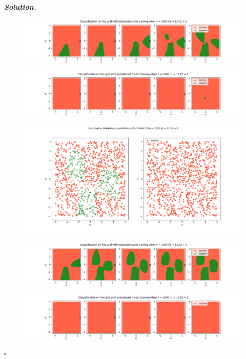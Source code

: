 \documentclass[10pt]{article}
\newenvironment{solution}[1][\it{Solution}]{\textbf{#1. } }{$\square$}
\begin{document}
\begin{solution}
\begin{figure}[H]
\includegraphics[width=16cm, keepaspectratio]{./3/32}
\end{figure}
\begin{figure}[H]
\includegraphics[width=16cm, keepaspectratio]{./3/33}
\end{figure}
\begin{figure}[H]
\includegraphics[width=16cm, keepaspectratio]{./3/34}
\end{figure}
\begin{figure}[H]
\includegraphics[width=16cm, keepaspectratio]{./3/35}
\end{figure}
\begin{figure}[H]
\includegraphics[width=16cm, keepaspectratio]{./3/36}

\end{figure}
\end{solution}
\end{document}
